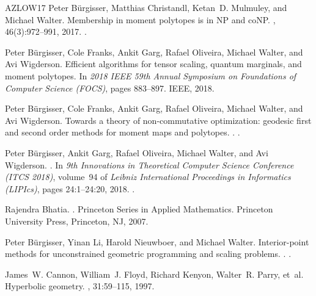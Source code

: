 \documentclass[10pt,a4paper]{article}
\numberwithin{equation}{section}
\begin{document}
\begin{thebibliography}{AZLOW17}
Peter B\"{u}rgisser, Matthias Christandl, Ketan~D. Mulmuley, and Michael
  Walter.
\newblock Membership in moment polytopes is in {NP} and co{NP}.
, 46(3):972--991, 2017.
\newblock \href {https://doi.org/10.1137/15M1048859}
  {}.

Peter B{\"u}rgisser, Cole Franks, Ankit Garg, Rafael Oliveira, Michael Walter,
  and Avi Wigderson.
\newblock Efficient algorithms for tensor scaling, quantum marginals, and
  moment polytopes.
\newblock In {\em 2018 IEEE 59th Annual Symposium on Foundations of Computer
  Science (FOCS)}, pages 883--897. IEEE, 2018.

Peter B{\"u}rgisser, Cole Franks, Ankit Garg, Rafael Oliveira, Michael Walter,
  and Avi Wigderson.
\newblock Towards a theory of non-commutative optimization: geodesic first and
  second order methods for moment maps and polytopes.
.
\newblock \href {http://arxiv.org/abs/1910.12375} {}.

Peter B{\"u}rgisser, Ankit Garg, Rafael Oliveira, Michael Walter, and Avi
  Wigderson.
.
\newblock In {\em 9th Innovations in Theoretical Computer Science Conference
  (ITCS 2018)}, volume~94 of {\em Leibniz International Proceedings in
  Informatics (LIPIcs)}, pages 24:1--24:20, 2018.
\newblock \href {https://doi.org/10.4230/LIPIcs.ITCS.2018.24}
  {}.

Rajendra Bhatia.
.
\newblock Princeton Series in Applied Mathematics. Princeton University Press,
  Princeton, NJ, 2007.

Peter B{\"u}rgisser, Yinan Li, Harold Nieuwboer, and Michael Walter.
\newblock Interior-point methods for unconstrained geometric programming and
  scaling problems.
.
\newblock \href {http://arxiv.org/abs/2008.12110} {}.

James~W. Cannon, William~J. Floyd, Richard Kenyon, Walter~R. Parry, et~al.
\newblock Hyperbolic geometry.
, 31:59--115, 1997.


\end{thebibliography}
\end{document}
